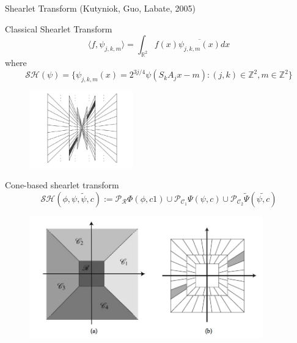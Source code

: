 \begin{frame}{Shearlet Transform (Kutyniok, Guo, Labate, 2005)}
\begin{block}{Classical Shearlet Transform}
$$
\langle f,\psi_{j,k,m}\rangle =\int_{\mathbb{R}^2}f(x)\overline{\psi_{j,k,m}(x)}dx
$$
\pause
where
$$
\mathcal{SH}(\psi)=\{\psi_{j,k,m}(x)=2^{3j/4}\psi (S_kA_jx-m):(j,k)\in\mathbb{Z}^2,m\in\mathbb{Z}^2\}
$$
\end{block}
\pause
\begin{figure}[h!]
\centering
\includegraphics[width=0.4\textwidth]{./Images/tiling_nocone.jpg}
\end{figure}
\end{frame}

\begin{frame}{Cone-based shearlet transform}
$$
\mathcal{SH}(\phi,\psi,\tilde{\psi},c):=\mathcal{P}_{\mathcal{R}}\Phi(\phi,c1)\cup\mathcal{P}_{\mathcal{C}_1}\Psi(\psi,c)\cup\mathcal{P}_{\mathcal{C}_2}\tilde{\Psi}(\tilde{\psi,c})
$$
\pause
\begin{figure}[h!]
\centering
\includegraphics[width=0.9\textwidth]{./Images/tiling_cone}
\end{figure}
\end{frame}

